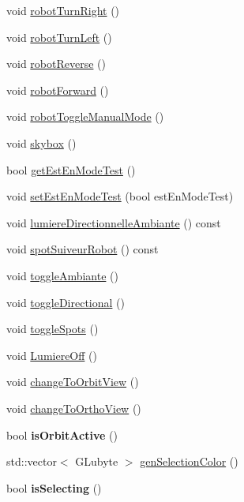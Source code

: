 \begin{DoxyCompactItemize}
\item 
void \hyperlink{group__inf2990_gad7ed7270a0485181ddcce168ef035db9}{robot\-Turn\-Right} ()
\item 
void \hyperlink{group__inf2990_ga315a7219bfaadcf4b5667aa26e715a59}{robot\-Turn\-Left} ()
\item 
void \hyperlink{group__inf2990_ga0337e81d62cf2a38aace4b6bc0a9056a}{robot\-Reverse} ()
\item 
void \hyperlink{group__inf2990_ga7d7a91c04dd796ce9db41286868b092c}{robot\-Forward} ()
\item 
void \hyperlink{group__inf2990_ga3e853c603a2393bbaf048b225eb47483}{robot\-Toggle\-Manual\-Mode} ()
\item 
void \hyperlink{group__inf2990_gab070cb5e807e3d52e6471bca84da58c1}{skybox} ()
\item 
bool \hyperlink{group__inf2990_ga1bfff8664184ba8ecabd7855617fc0a3}{get\-Est\-En\-Mode\-Test} ()
\item 
void \hyperlink{group__inf2990_ga685064f7892c9404453742a670081054}{set\-Est\-En\-Mode\-Test} (bool est\-En\-Mode\-Test)
\item 
void \hyperlink{group__inf2990_ga6db69b55af392317e9a3a38157ec0111}{lumiere\-Directionnelle\-Ambiante} () const 
\item 
void \hyperlink{group__inf2990_ga2165572f1f551e98af72daee238bf2d7}{spot\-Suiveur\-Robot} () const 
\item 
void \hyperlink{group__inf2990_ga2982ec28025802ed1d50e752911b5332}{toggle\-Ambiante} ()
\item 
void \hyperlink{group__inf2990_gabd835b688aaf5353eae2487da5df4f4a}{toggle\-Directional} ()
\item 
void \hyperlink{group__inf2990_ga3ac790567113a26aff4dcf7a614fa402}{toggle\-Spots} ()
\item 
void \hyperlink{group__inf2990_ga5f241684ec0114d116c6fcaff54ee85f}{Lumiere\-Off} ()
\item 
void \hyperlink{group__inf2990_ga8a0651f21346a7c43bede2fc68a7e0cf}{change\-To\-Orbit\-View} ()
\item 
void \hyperlink{group__inf2990_gad4818ae5a5280686ee88729cf2423199}{change\-To\-Ortho\-View} ()
\item 
\hypertarget{class_facade_modele_a60cf24278584098c4b289bc630525df3}{bool {\bfseries is\-Orbit\-Active} ()}\label{class_facade_modele_a60cf24278584098c4b289bc630525df3}

\item 
std\-::vector$<$ G\-Lubyte $>$ \hyperlink{group__inf2990_ga5b063c3392884c46da2a8e5688bd61d0}{gen\-Selection\-Color} ()
\item 
\hypertarget{class_facade_modele_a954d62e962ae540547a5a54dc02926f8}{bool {\bfseries is\-Selecting} ()}\label{class_facade_modele_a954d62e962ae540547a5a54dc02926f8}


\end{DoxyCompactItemize}
